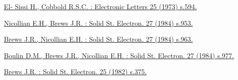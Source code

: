 
\begin{thebibliography}{}

  \href {http://ieeexplore.ieee.org/xpl/login.jsp?tp=&arnumber=4236397&url=http\%3A\%2F\%2Fieeexplore.ieee.org\%2Fstamp\%2Fstamp.jsp\%3Ftp\%3D\%26arnumber\%3D4236397}
  {El- Sissi H., Cobbold R.S.C. : Electronic Letters 25 (1973) s.594.}
  
  \href {http://www.sciencedirect.com/science/article/pii/0038110184900698}
  {Nicollian E.H., Brews J.R. : Solid St. Electron. 27 (1984) s.953.}
  
  \href {http://www.sciencedirect.com/science/article/pii/0038110184900704}
  {Brews J.R., Nicollian E.H. : Solid St. Electron. 27 (1984) s.963.}
  
  \href {http://www.sciencedirect.com/science/article/pii/0038110184900716}
  {Boulin D.M., Brews J.R., Nicollian E.H. : Solid St. Electron. 27 (1984) s.977.}
  
  \href {http://www.sciencedirect.com/science/article/pii/0038110182901228}
  {Brews J.R. : Solid St. Electron. 25 (1982) s.375.}
  
\end{thebibliography}
